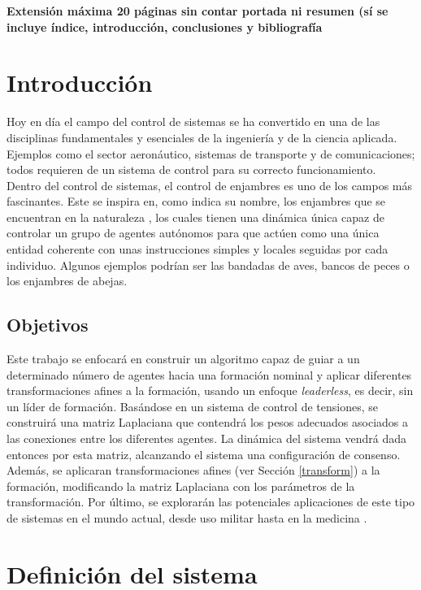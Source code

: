 \documentclass[11pt, a4paper]{article} %
\begin{document}
{\Large\textbf{Extensión máxima 20 páginas sin contar portada ni resumen (sí se incluye índice, introducción, conclusiones y bibliografía}}
\newpage

\tableofcontents
\pagebreak

\section{Introducción}
Hoy en día el campo del control de sistemas se ha convertido en una de las disciplinas fundamentales y esenciales de la ingeniería y de la ciencia aplicada. Ejemplos como el sector aeronáutico, sistemas de transporte y de comunicaciones; todos requieren de un sistema de control para su correcto funcionamiento.\\

Dentro del control de sistemas, el control de enjambres es uno de los campos más fascinantes. Este se inspira en, como indica su nombre, los enjambres que se encuentran en la naturaleza \cite{TAN201318}, los cuales tienen una dinámica única capaz de controlar un grupo de agentes autónomos para que actúen como una única entidad coherente con unas instrucciones simples y locales seguidas por cada individuo. Algunos ejemplos podrían ser las bandadas de aves, bancos de peces o los enjambres de abejas.

\subsection{Objetivos}

Este trabajo se enfocará en construir un algoritmo capaz de guiar a un determinado número de agentes hacia una formación nominal y aplicar diferentes transformaciones afines a la formación, usando un enfoque \textit{leaderless}, es decir, sin un líder de formación. Basándose en un sistema de control de tensiones, se construirá una matriz Laplaciana que contendrá los pesos adecuados asociados a las conexiones entre los diferentes agentes. La dinámica del sistema vendrá dada entonces por esta matriz, alcanzando el sistema una configuración de consenso. Además,  se aplicaran transformaciones afines (ver Sección \ref{transform}) a la formación, modificando la matriz Laplaciana con los parámetros de la transformación. Por último, se explorarán las potenciales aplicaciones de este tipo de sistemas en el mundo actual, desde uso militar hasta en la medicina \cite{gold17283}.

\section{Definición del sistema}
\end{document}
